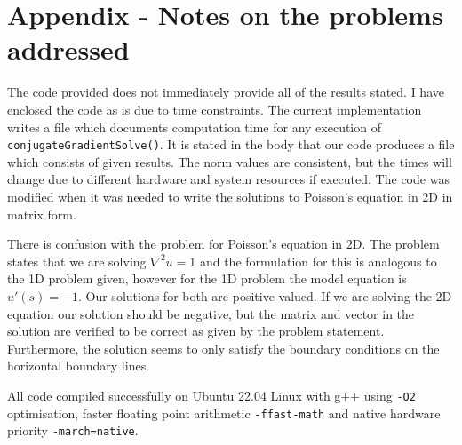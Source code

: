 \documentclass{article}
\begin{document}
\section{Appendix - Notes on the problems addressed}

The code provided does not immediately provide all of the results stated.
I have enclosed the code as is due to time constraints.
The current implementation writes a file which documents computation time for any execution of \texttt{conjugateGradientSolve()}.
It is stated in the body that our code produces a file which consists of given results.
The norm values are consistent, but the times will change due to different hardware and system resources if executed.
The code was modified when it was needed to write the solutions to Poisson's equation in 2D in matrix form.

There is confusion with the problem for Poisson's equation in $2$D.
The problem states that we are solving $\nabla^2 u = 1$ and the formulation for this is analogous to the 1D problem given,
however for the 1D problem the model equation is $u'(s) = -1$.
Our solutions for both are positive valued.
If we are solving the 2D equation our solution should be negative,
but the matrix and vector in the solution are verified to be correct as given by the problem statement.
Furthermore, the solution seems to only satisfy the boundary conditions on the horizontal boundary lines.
\bigskip

All code compiled successfully on Ubuntu 22.04 Linux with g++ using \texttt{-O2} optimisation, faster floating point arithmetic \texttt{-ffast-math} and native hardware priority \texttt{-march=native}.
\end{document}
